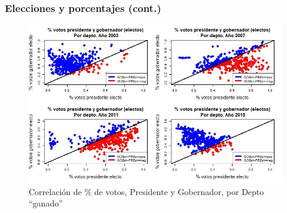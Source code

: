 \documentclass[a4paper,handout,mathserif,final,xcolor=dvipsnames,twocolumn]{beamer}
\begin{document}
\begin{frame}\frametitle{Elecciones y porcentajes (cont.)}
  \begin{figure}[htbp]
    \centering \vspace{-0.25cm}
    \includegraphics[scale=0.375]{coattails1}
    \caption{Correlación de \% de votos, Presidente y Gobernador, por
      Depto ``ganado''}
    \label{fig:1}
  \end{figure}
\end{frame}






\end{document}
